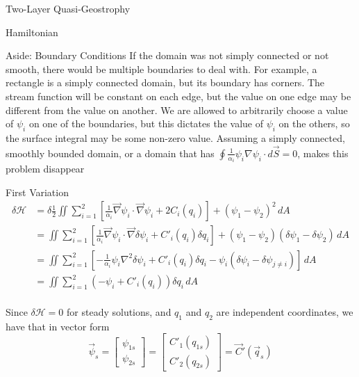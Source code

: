 \documentclass[12pt]{article}
\begin{document}
\begin{section}{Two-Layer Quasi-Geostrophy}
\begin{subsection}{Hamiltonian}
\begin{subsubsection}{Aside: Boundary Conditions}
            If the domain was not simply connected or not smooth, there would be multiple boundaries to deal with. For example, a rectangle is a simply connected domain, but its boundary has corners. The stream function will be constant on each edge, but the value on one edge may be different from the value on another. We are allowed to arbitrarily choose a value of $\psi_i$ on one of the boundaries, but this dictates the value of $\psi_i$ on the others, so the surface integral may be some non-zero value. Assuming a simply connected, smoothly bounded domain, or a domain that has $\oint \frac{1}{\alpha_i}\psi_i \nabla \psi_i\cdot d \vec S = 0$, makes this problem disappear
        \end{subsubsection}
    \end{subsection}

    \begin{subsection}{First Variation}
        \begin{align*}
            \delta \mathcal{H} &= \delta \frac12 \iint \sum_{i=1}^2 \left[ \frac{1}{\alpha_i} \vec\nabla \psi_i \cdot \vec\nabla \psi_i + 2C_i(q_i) \right]+ (\psi_1 - \psi_2)^2 \, dA \\
            &= \iint \sum_{i=1}^2 \left[ \frac{1}{\alpha_i} \vec\nabla \psi_i \cdot \vec\nabla \delta\psi_i + C'_i(q_i) \delta q_i \right]+ (\psi_1 - \psi_2)(\delta \psi_1 - \delta \psi_2) \, dA \\
            &= \iint \sum_{i=1}^2 \left[ -\frac{1}{\alpha_i} \psi_i \nabla^2 \delta\psi_i + C'_i(q_i) \delta q_i - \psi_i(\delta \psi_i - \delta \psi_{j \ne i}) \right] \, dA \\
            &= \iint \sum_{i=1}^2 (-\psi_i + C'_i(q_i)) \delta q_i\, dA \\
        \end{align*}

        Since $\delta \mathcal{H} = 0$ for steady solutions, and $q_1$ and $q_2$ are independent coordinates, we have that in vector form
        \begin{equation}
            \vec \psi_s =
            \left[\begin{array}{c}
            \psi_{1s} \\
            \psi_{2s}
            \end{array}\right]
            =
            \left[\begin{array}{c}
            C'_1(q_{1s}) \\
            C'_2(q_{2s})
            \end{array}\right]
            =
            \vec C'(\vec q_s)
        \end{equation}
    \end{subsection}


\end{section}
\end{document}
